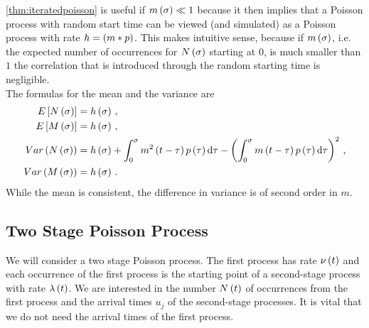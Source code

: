 \documentclass{amsart}
\numberwithin{equation}{section}
\begin{document}
\begin{remark}
\autoref{thm:iteratedpoisson} is useful if $m\left(\sigma\right) \ll 1$ because it then implies that a Poisson process with random start time can be viewed (and simulated) as a Poisson process with rate $h = \left(m \ast p\right)$. This makes intuitive sense, because if $m\left(\sigma\right)$, i.e. the expected number of occurrences for $N\left(\sigma\right)$ starting at $0$, is much smaller than $1$ the correlation that is introduced through the random starting time is negligible.\\

\noindent The formulas for the mean and the variance are
\begin{align*}
E\left[N\left(\sigma\right)\right] &= h\left(\sigma\right) \, ,\\
E\left[M\left(\sigma\right)\right] &= h\left(\sigma\right) \, ,\\
Var\left(N\left(\sigma\right)\right) &= h\left(\sigma\right) + \int_0^\sigma m^2\left(t-\tau\right) p\left(\tau\right) \mathrm{d}\tau - \left(\int_0^\sigma m\left(t-\tau\right) p\left(\tau\right) \mathrm{d}\tau\right)^2 \, , \\
Var\left(M\left(\sigma\right)\right) &= h\left(\sigma\right) \, .
\end{align*}
While the mean is consistent, the difference in variance is of second order in $m$.
\end{remark}



\subsection{Two Stage Poisson Process}
We will consider a two stage Poisson process. The first process has rate $\nu\left(t\right)$ and each occurrence of the first process is the starting point of a second-stage process with rate $\lambda\left(t\right)$. We are interested in the number $N\left(t\right)$ of occurrences from the first process and the arrival times $u_j$ of the second-stage processes. It is vital that we do not need the arrival times of the first process.
\end{document}
